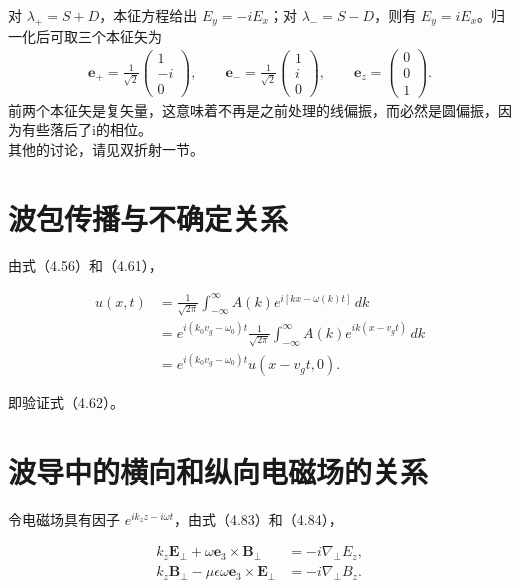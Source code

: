 \documentclass{article}
\begin{document}
对 $\lambda_+=S+D$，本征方程给出 $E_y=-iE_x$；对 $\lambda_-=S-D$，则有 $E_y=iE_x$。归一化后可取三个本征矢为
\begin{align}
    \boxed{
    \mathbf e_+=\frac{1}{\sqrt2}\begin{pmatrix}1\\-i\\0\end{pmatrix},\qquad
    \mathbf e_- =\frac{1}{\sqrt2}\begin{pmatrix}1\\i\\0\end{pmatrix},\qquad
    \mathbf e_z=\begin{pmatrix}0\\0\\1\end{pmatrix}.}
\end{align}
前两个本征矢是复矢量，这意味着不再是之前处理的线偏振，而必然是圆偏振，因为有些落后了i的相位。
\\
其他的讨论，请见双折射一节。
\\

\section{波包传播与不确定关系}

由式（4.56）和（4.61），

\begin{align}
u(x,t)
&=\frac{1}{\sqrt{2\pi}}
\int_{-\infty}^{\infty}
A(k)e^{i[kx-\omega(k)t]}\,dk\\
&=e^{i(k_0v_g-\omega_0)t}
\frac{1}{\sqrt{2\pi}}
\int_{-\infty}^{\infty}
A(k)e^{ik(x-v_gt)}\,dk\\
&=e^{i(k_0v_g-\omega_0)t}u(x-v_gt,0).
\end{align}

即验证式（4.62）。

\section{波导中的横向和纵向电磁场的关系}

令电磁场具有因子 $e^{ik_zz-i\omega t}$，由式（4.83）和（4.84），

\begin{align}
k_z\mathbf E_\perp
+\omega\mathbf e_3\times\mathbf B_\perp
&=-i\nabla_\perp E_z,\\
k_z\mathbf B_\perp
-\mu\epsilon\omega\mathbf e_3\times\mathbf E_\perp
&=-i\nabla_\perp B_z.
\end{align}
\end{document}
